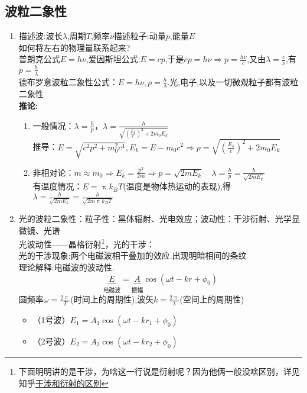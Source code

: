 \documentclass{article}
\begin{document}
\subsection{波粒二象性}
\begin{enumerate}[label=(\arabic*)]
	\item 描述波:波长$\lambda$,周期$T$,频率$\nu$\quad 描述粒子:动量$p$,能量$E$\\
				如何将左右的物理量联系起来?\\
				普朗克公式$E=h\nu$,爱因斯坦公式:$E=cp$,于是$cp=h\nu \Rightarrow p=\frac{h\nu}{c}$,又由$\lambda=\frac{c}{\nu}$,有$p=\frac{h}{\lambda}$\\
				德布罗意波粒二象性公式：$E=h\nu,p=\frac{h}{\lambda}$.光,电子,以及一切微观粒子都有波粒二象性\\
				\textbf{推论:}\begin{enumerate}[label=(\alph*)]
					\item 一般情况：$\lambda=\frac{h}{p}$，$\lambda=\frac{h}{\sqrt{(\frac{E_k}{c})^2+2m_0E_k}}$\\
								推导：$E=\sqrt{c^2p^2+m_0^2c^4},E_k=E-m_0c^2\Rightarrow p=\sqrt{\left(\frac{E_k}{c}\right)^2+2m_0E_k}$
					\item 非相对论：$m\approx m_0\Rightarrow E_k=\frac{p^2}{2m}\Rightarrow p=\sqrt{2mE_k}\quad \lambda=\frac{h}{p}=\frac{h}{\sqrt{2mE_k}}$\\
								有温度情况：$E=\uppi k_B T$(温度是物体热运动的表现),得$\lambda=\frac{h}{\sqrt{2mE_k}}=\frac{h}{\sqrt{2m\uppi k_B T}}$
				\end{enumerate}
	\item 光的波粒二象性：粒子性：黑体辐射、光电效应；波动性：干涉衍射、光学显微镜、光谱\\
				光波动性——晶格衍射\footnote{下面明明讲的是干涉，为啥这一行说是衍射呢？因为他俩一般没啥区别，详见知乎\href{https://www.zhihu.com/question/30233166}{干涉和衍射的区别}}，光的干涉：\\
				光的干涉现象:两个电磁波相干叠加的效应.出现明暗相间的条纹\\
				理论解释:电磁波的波动性.
				\[\underbrace{E}_{\text{电磁波}} = \underbrace{A}_{\text{振幅}}\cos (\omega t-kr+\phi_0)\]
				圆频率$\omega=\frac{2\uppi}{T}$(时间上的周期性),波矢$k=\frac{2\uppi}{\lambda}$(空间上的周期性)\\
				\begin{itemize}
					\item （1号波）$E_1 = A_1\cos (\omega t-kr_1+\phi_0)$
					\item （2号波）$E_2 = A_2\cos (\omega t-kr_2+\phi_0)$

\end{itemize}
\end{enumerate}
\end{document}
